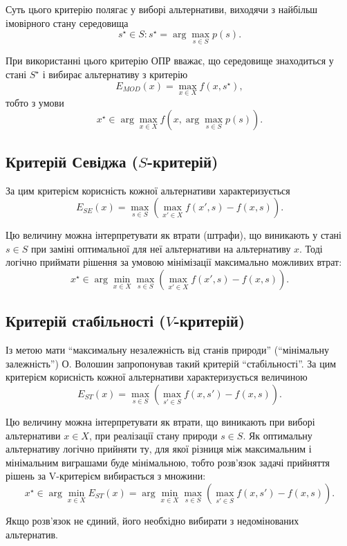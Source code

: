 Суть цього критерію полягає у виборі альтернативи, виходячи з найбільш імовірного стану середовища 
\[s^\star \in S: s^\star = \arg\max\limits_{s \in S} p(s).\]

При використанні цього критерію ОПР вважає, що середовище знаходиться у стані $S^\star$ і вибирає альтернативу з критерію 
\[E_{MOD}(x) = \max\limits_{x \in X} f(x, s^\star),\]
тобто з умови
\[x^\star \in \arg\max\limits_{x \in X} f(x, \arg\max\limits_{s \in S} p(s)).\]

\subsection{Критерій Севіджа ($S$-критерій)}

За цим критерієм корисність кожної альтернативи характеризується
\[E_{SE}(x) = \max\limits_{s \in S} \left( \max\limits_{x' \in X} f(x', s) - f(x, s) \right).\]

Цю величину можна інтерпретувати як втрати (штрафи), що виникають у стані $s \in S$ при заміні оптимальної для неї альтернативи на альтернативу $x$. Тоді логічно приймати рішення за умовою мінімізації максимально можливих втрат:
\[x^\star \in \arg\min\limits_{x \in X} \max\limits_{s \in S} \left( \max\limits_{x' \in X} f(x', s) - f(x, s) \right).\]

\subsection{Критерій стабільності ($V$-критерій)}

Із метою мати ``максимальну незалежність від станів природи'' (``мінімальну залежність'') О. Волошин запропонував такий критерій ``стабільності''. За цим критерієм корисність кожної альтернативи характеризується величиною
\[E_{ST}(x) = \max\limits_{s \in S} \left( \max\limits_{s' \in S} f(x, s') - f(x, s) \right).\]

Цю величину можна інтерпретувати як втрати, що виникають при виборі альтернативи $x \in X$, при реалізації стану природи $s \in S$. Як оптимальну альтернативу логічно прийняти ту, для якої різниця між максимальним і мінімальним виграшами буде мінімальною, тобто розв'язок задачі прийняття рішень за V-критерієм вибирається з множини:
\[x^\star \in \arg\min\limits_{x \in X} E_{ST}(x) = \arg\min\limits_{x \in X} \max\limits_{s \in S} \left( \max\limits_{s' \in S} f(x, s') - f(x, s) \right).\]

Якщо розв'язок не єдиний, його необхідно вибирати з недомінованих альтернатив.

